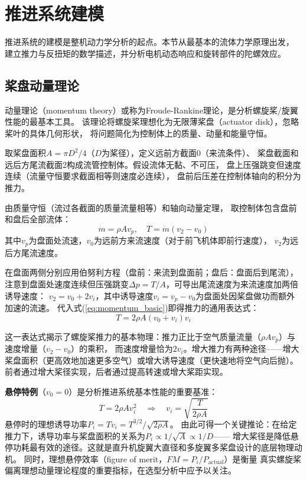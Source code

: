 \section{推进系统建模}
\label{sec:propulsion}

推进系统的建模是整机动力学分析的起点。本节从最基本的流体力学原理出发，
建立推力与反扭矩的数学描述，并分析电机动态响应和旋转部件的陀螺效应。

\subsection{桨盘动量理论}

动量理论（momentum theory）或称为Froude-Rankine理论，是分析螺旋桨/旋翼性能的最基本工具。
该理论将螺旋桨理想化为无限薄桨盘（actuator disk），忽略桨叶的具体几何形状，
将问题简化为控制体上的质量、动量和能量守恒\cite{leishman2006helicopter}。



取桨盘面积$A = \pi D^2 / 4$（$D$为桨径），定义远前方截面0（来流条件）、
桨盘截面和远后方尾流截面2构成流管控制体。假设流体无黏、不可压，
盘上压强跳变但速度连续（流量守恒要求截面相等则速度必连续），
盘前后压差在控制体轴向的积分为推力。

由质量守恒（流过各截面的质量流量相等）和轴向动量定理，
取控制体包含盘前和盘后全部流体：
\begin{equation}
    \dot{m} = \rho A v_p, \quad
    T = \dot{m} (v_2 - v_0)
    \label{eq:momentum_basic}
\end{equation}
其中$v_p$为盘面处流速，$v_0$为远前方来流速度（对于前飞机体即前行速度），
$v_2$为远后方尾流速度。

在盘面两侧分别应用伯努利方程（盘前：来流到盘面前；盘后：盘面后到尾流），
注意到盘面处速度连续但压强跳变$\Delta p = T/A$，可导出尾流速度为来流速度加两倍诱导速度：
$v_2 = v_0 + 2v_i$，其中诱导速度$v_i = v_p - v_0$为盘面处因桨盘做功而额外加速的流速。
代入式(\ref{eq:momentum_basic})即得推力的通用表达式：
\begin{equation}
    T = 2\rho A (v_0 + v_i) v_i
    \label{eq:thrust_general}
\end{equation}

这一表达式揭示了螺旋桨推力的基本物理：推力正比于空气质量流量（$\rho A v_p$）与速度增量（$v_2-v_0$）的乘积，
而速度增量恰为$2v_i$。增大推力有两种途径——增大桨盘面积（更高效地加速更多空气）或增大诱导速度（更快速地将空气向后抛）。
前者通过增大桨径实现，后者通过提高转速或增大桨距实现。

\textbf{悬停特例}（$v_0 = 0$）是分析推进系统基本性能的重要基准：
\begin{equation}
    T = 2\rho A v_i^2 \quad\Longrightarrow\quad
    v_i = \sqrt{\frac{T}{2\rho A}}
    \label{eq:hover_induced}
\end{equation}
悬停时的理想诱导功率$P_i = T v_i = T^{3/2} / \sqrt{2\rho A}$。
由此可得一个关键推论：在给定推力下，诱导功率与桨盘面积的关系为$P_i \propto 1/\sqrt{A} \propto 1/D$——
增大桨径是降低悬停功耗最有效的途径。这就是直升机旋翼大直径和多旋翼多桨盘设计的底层物理动机。
同时，理想悬停效率（figure of merit，$FM = P_i / P_{\text{actual}}$）是衡量
真实螺旋桨偏离理想动量理论程度的重要指标，在选型分析中应予以关注。

